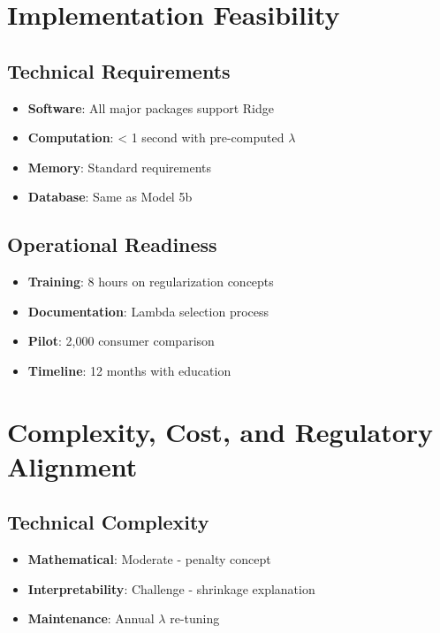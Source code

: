\section{Implementation Feasibility}

\subsection{Technical Requirements}

\begin{itemize}
    \item \textbf{Software}: All major packages support Ridge
    \item \textbf{Computation}: < 1 second with pre-computed $\lambda$
    \item \textbf{Memory}: Standard requirements
    \item \textbf{Database}: Same as Model 5b
\end{itemize}

\subsection{Operational Readiness}

\begin{itemize}
    \item \textbf{Training}: 8 hours on regularization concepts
    \item \textbf{Documentation}: Lambda selection process
    \item \textbf{Pilot}: 2,000 consumer comparison
    \item \textbf{Timeline}: 12 months with education
\end{itemize}

\section{Complexity, Cost, and Regulatory Alignment}

\subsection{Technical Complexity}

\begin{itemize}
    \item \textbf{Mathematical}: Moderate - penalty concept
    \item \textbf{Interpretability}: Challenge - shrinkage explanation
    \item \textbf{Maintenance}: Annual $\lambda$ re-tuning
\end{itemize}

